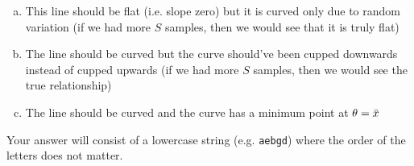 \documentclass[12pt,landscape]{article}
\newcommand{\instr}{\small Your answer will consist of a lowercase string (e.g. \texttt{aebgd}) where the order of the letters does not matter. \normalsize}
\begin{document}
\vspace{-0.2cm}\benum{} 

\begin{enumerate}[(a)]
\item This line should be flat (i.e. slope zero) but it is curved only due to random variation (if we had more $S$ samples, then we would see that it is truly flat)
\item The line should be curved but the curve should've been cupped downwards instead of cupped upwards (if we had more $S$ samples, then we would see the true relationship) 
\item The line should be curved and the curve has a minimum point at $\theta = \bar{x}$
\end{enumerate}
\eenum\instr\pagebreak
\end{document}
